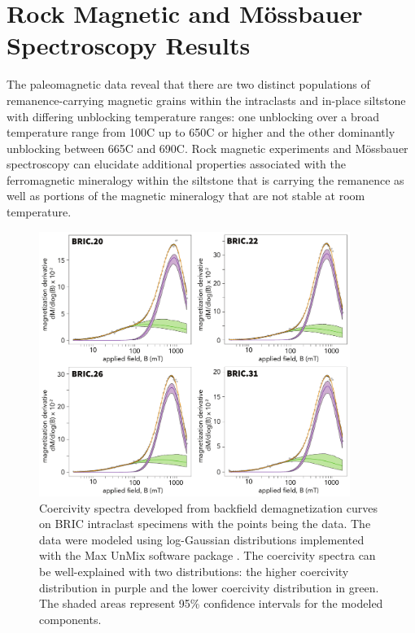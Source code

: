 \documentclass[draft]{agujournal2019}
\begin{document}
\section*{Rock Magnetic and M{\"o}ssbauer Spectroscopy Results}

The paleomagnetic data reveal that there are two distinct populations of remanence-carrying magnetic grains within the intraclasts and in-place siltstone with differing unblocking temperature ranges: one unblocking over a broad temperature range from 100\textdegree C up to 650\textdegree C or higher and the other dominantly unblocking between 665\textdegree C and 690\textdegree C. Rock magnetic experiments and M{\"o}ssbauer spectroscopy can elucidate additional properties associated with the ferromagnetic mineralogy within the siltstone that is carrying the remanence as well as portions of the magnetic mineralogy that are not stable at room temperature.

\begin{figure}[!ht]
\noindent\includegraphics[width=0.9\textwidth]{Fig4_coercivity_spectra.pdf}
\caption{\small{Coercivity spectra developed from backfield demagnetization curves on BRIC intraclast specimens with the points being the data. The data were modeled using log-Gaussian distributions implemented with the Max UnMix software package \cite{Maxbauer2016a}. The coercivity spectra can be well-explained with two distributions: the higher coercivity distribution in purple and the lower coercivity distribution in green. The shaded areas represent 95\% confidence intervals for the modeled components.}}
\label{fig:coercivity_spectra}
\end{figure}
\end{document}

